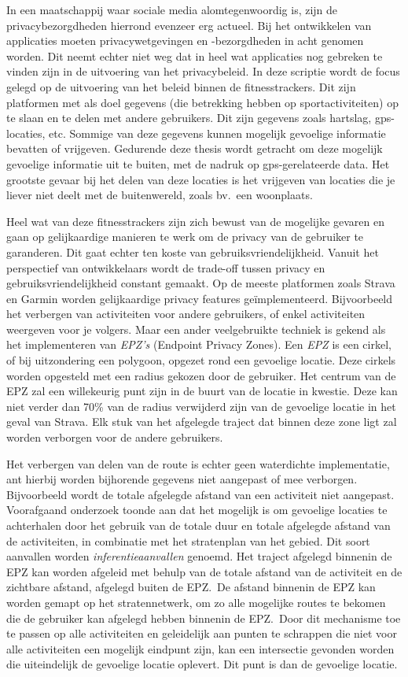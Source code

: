 In een maatschappij waar sociale media alomtegenwoordig is, zijn de
privacybezorgdheden hierrond evenzeer erg actueel. Bij het ontwikkelen van
applicaties moeten privacywetgevingen en -bezorgdheden in acht genomen worden.
Dit neemt echter niet weg dat in heel wat applicaties nog gebreken te vinden
zijn in de uitvoering van het privacybeleid. In deze scriptie wordt de focus
gelegd op de uitvoering van het beleid binnen de fitnesstrackers. Dit zijn
platformen met als doel gegevens (die betrekking hebben op sportactiviteiten)
op te slaan en te delen met andere gebruikers. Dit zijn gegevens zoals
hartslag, gps-locaties, etc. Sommige van deze gegevens kunnen mogelijk
gevoelige informatie bevatten of vrijgeven. Gedurende deze thesis wordt
getracht om deze mogelijk gevoelige informatie uit te buiten, met de nadruk op
gps-gerelateerde data. Het grootste gevaar bij het delen van deze locaties is
het vrijgeven van locaties die je liever niet deelt met de buitenwereld, zoals
bv.\ een woonplaats.

Heel wat van deze fitnesstrackers zijn zich bewust van de mogelijke gevaren en
gaan op gelijkaardige manieren te werk om de privacy van de gebruiker te
garanderen. Dit gaat echter ten koste van gebruiksvriendelijkheid. Vanuit het
perspectief van ontwikkelaars wordt de trade-off tussen privacy en
gebruiksvriendelijkheid constant gemaakt. Op de meeste platformen zoals Strava
en Garmin worden gelijkaardige privacy features geïmplementeerd. Bijvoorbeeld
het verbergen van activiteiten voor andere gebruikers, of enkel activiteiten
weergeven voor je volgers. Maar een ander veelgebruikte techniek is gekend als
het implementeren van \textit{EPZ's} (Endpoint Privacy Zones). Een \textit{EPZ}
is een cirkel, of bij uitzondering een polygoon, opgezet rond een gevoelige
locatie. Deze cirkels worden opgesteld met een radius gekozen door de
gebruiker. Het centrum van de EPZ zal een willekeurig punt zijn in de buurt van
de locatie in kwestie. Deze kan niet verder dan 70\% van de radius verwijderd
zijn van de gevoelige locatie in het geval van Strava. Elk stuk van het
afgelegde traject dat binnen deze zone ligt zal worden verborgen voor de andere
gebruikers.

Het verbergen van delen van de route is echter geen waterdichte implementatie,
ant hierbij worden bijhorende gegevens niet aangepast of mee verborgen.
Bijvoorbeeld wordt de totale afgelegde afstand van een activiteit niet
aangepast. Voorafgaand onderzoek toonde aan dat het mogelijk is om gevoelige
locaties te achterhalen door het gebruik van de totale duur en totale afgelegde
afstand van de activiteiten, in combinatie met het stratenplan van het gebied.
Dit soort aanvallen worden \textit{inferentieaanvallen} genoemd. Het traject
afgelegd binnenin de EPZ kan worden afgeleid met behulp van de totale afstand
van de activiteit en de zichtbare afstand, afgelegd buiten de EPZ.\ De afstand
binnenin de EPZ kan worden gemapt op het stratennetwerk, om zo alle mogelijke
routes te bekomen die de gebruiker kan afgelegd hebben binnenin de EPZ.\ Door
dit mechanisme toe te passen op alle activiteiten en geleidelijk aan punten te
schrappen die niet voor alle activiteiten een mogelijk eindpunt zijn, kan een
intersectie gevonden worden die uiteindelijk de gevoelige locatie oplevert. Dit
punt is dan de gevoelige locatie.

